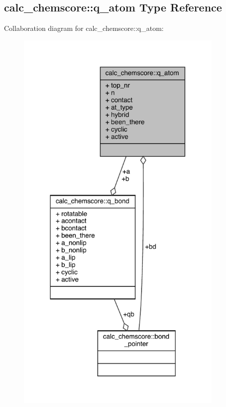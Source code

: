 \hypertarget{structcalc__chemscore_1_1q__atom}{\subsection{calc\-\_\-chemscore\-:\-:q\-\_\-atom Type Reference}
\label{structcalc__chemscore_1_1q__atom}
}


Collaboration diagram for calc\-\_\-chemscore\-:\-:q\-\_\-atom\-:
\nopagebreak
\begin{figure}[H]
\begin{center}
\leavevmode
\includegraphics[width=283pt]{structcalc__chemscore_1_1q__atom__coll__graph}
\end{center}
\end{figure}
